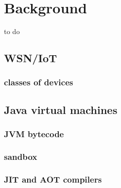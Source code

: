 \chapter{Background}
to do

\section{WSN/IoT}
\subsection{classes of devices}


\section{Java virtual machines}
\subsection{JVM bytecode}
\subsection{sandbox}
\subsection{JIT and AOT compilers}


